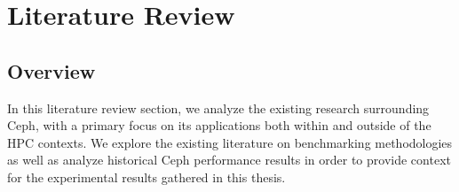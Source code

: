 \pagebreak
\section{Literature Review}
\label{sec:literature-review}

\subsection{Overview}

In this literature review section, we analyze the existing research surrounding Ceph, with a primary focus on its applications both within and outside of the \ac{HPC} contexts. We explore the existing literature on benchmarking methodologies as well as analyze historical Ceph performance results in order to provide context for the experimental results gathered in this thesis.



